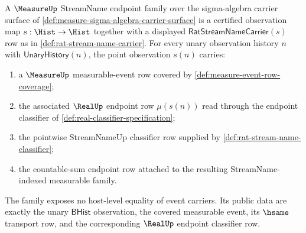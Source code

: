 \begin{definition}
\label{def:measure-streamname-endpoint-family}
A $\MeasureUp$ StreamName endpoint family over the sigma-algebra carrier
surface of \autoref{def:measure-sigma-algebra-carrier-surface} is a
certified observation map $s:\Hist\to\Hist$ together with a displayed
$\mathsf{RatStreamNameCarrier}(s)$ row as in
\autoref{def:rat-stream-name-carrier}. For every unary observation history
$n$ with $\mathsf{UnaryHistory}(n)$, the point observation $s(n)$ carries:
\begin{enumerate}
  \item a $\MeasureUp$ measurable-event row covered by
  \autoref{def:measure-event-row-coverage};
  \item the associated $\RealUp$ endpoint row $\mu(s(n))$ read through the
  endpoint classifier of \autoref{def:real-classifier-specification};
  \item the pointwise StreamNameUp classifier row supplied by
  \autoref{def:rat-stream-name-classifier};
  \item the countable-sum endpoint row attached to the resulting
  StreamName-indexed measurable family.
\end{enumerate}
The family exposes no host-level equality of event carriers. Its public data
are exactly the unary $\mathsf{BHist}$ observation, the covered measurable
event, its $\hsame$ transport row, and the corresponding $\RealUp$ endpoint
classifier row.
\end{definition}

